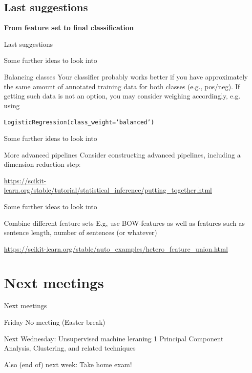 \documentclass{beamer}
\begin{document}
\subsection{Last suggestions}

\begin{frame}[plain]
\textbf{From feature set to final classification}

Last suggestions
\end{frame}


\begin{frame}{Some further ideas to look into}

\begin{block}{Balancing classes}
Your classifier probably works better if you have approximately the same amount of annotated training data for both classes (e.g., pos/neg). If getting such data is not an option, you may consider weighing accordingly, e.g. using

\texttt{LogisticRegression(class\_weight='balanced')}
\end{block}

\end{frame}

\begin{frame}{Some further ideas to look into}

\begin{block}{More advanced pipelines}
	Consider constructing advanced pipelines, including a dimension reduction step: 
	
	
	\url{https://scikit-learn.org/stable/tutorial/statistical\_inference/putting\_together.html}
\end{block}

\end{frame}



\begin{frame}{Some further ideas to look into}

\begin{block}{Combine different feature sets}
	E.g, use BOW-features as well as features such as sentence length, number of sentences (or whatever)
	
	
	\url{
		https://scikit-learn.org/stable/auto\_examples/hetero\_feature\_union.html}
\end{block}




\end{frame}




\section{Next meetings}




\begin{frame}{Next meetings}
\begin{block}{Friday}
No meeting (Easter break)
\end{block}

\begin{block}{Next Wednesday: Unsupervised machine leraning 1}
Principal Component Analysis, Clustering, and related techniques
\end{block}

Also (end of) next week: Take home exam!


\end{frame}
\end{document}
